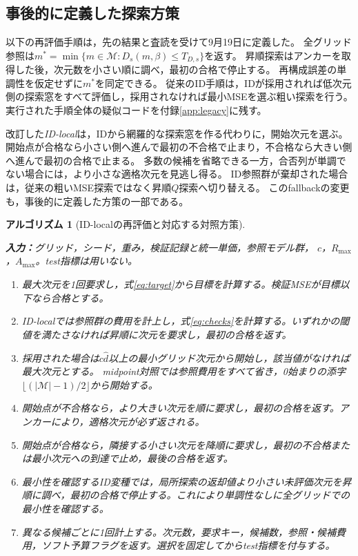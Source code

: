 \documentclass[11pt,a4paper]{ltjsarticle}
\newtheorem{Algorithm}{アルゴリズム}
\begin{document}
\subsection{事後的に定義した探索方策}\label{sec:replay}
以下の再評価手順は，先の結果と査読を受けて9月19日に定義した。
全グリッド参照は$m^*=\min\{m\in\mathcal M:D_s(m,\beta)\le T_{D,s}\}$を返す。
昇順探索はアンカーを取得した後，次元数を小さい順に調べ，最初の合格で停止する。
再構成誤差の単調性を仮定せずに$m^*$を同定できる。
従来のID手順は，IDが採用されれば低次元側の探索窓をすべて評価し，採用されなければ最小MSEを選ぶ粗い探索を行う。
実行された手順全体の疑似コードを付録\ref{app:legacy}に残す。

改訂した\emph{ID-local}は，IDから網羅的な探索窓を作る代わりに，開始次元を選ぶ。
開始点が合格なら小さい側へ進んで最初の不合格で止まり，不合格なら大きい側へ進んで最初の合格で止まる。
多数の候補を省略できる一方，合否列が単調でない場合には，より小さな適格次元を見逃し得る。
ID参照群が棄却された場合は，従来の粗いMSE探索ではなく昇順$Q$探索へ切り替える。
このfallbackの変更も，事後的に定義した方策の一部である。

\medskip\noindent\begin{minipage}{\linewidth}
\begin{Algorithm}[ID-localの再評価と対応する対照方策]
\label{alg:replay}\normalfont\small\leavevmode\par\noindent
\textbf{入力：}グリッド，シード，重み，検証記録と統一単価，参照モデル群，
$c$，$R_{\max}$，$A_{\max}$。test指標は用いない。
\begin{enumerate}
\item 最大次元を1回要求し，式\ref{eq:target}から目標を計算する。検証MSEが目標以下なら合格とする。
\item ID-localでは参照群の費用を計上し，式\ref{eq:checks}を計算する。いずれかの閾値を満たさなければ昇順に次元を要求し，最初の合格を返す。
\item 採用された場合は$c\hat d$以上の最小グリッド次元から開始し，該当値がなければ最大次元とする。
midpoint対照では参照費用をすべて省き，0始まりの添字$\lfloor(|\mathcal M|-1)/2\rfloor$から開始する。
\item 開始点が不合格なら，より大きい次元を順に要求し，最初の合格を返す。アンカーにより，適格次元が必ず返される。
\item 開始点が合格なら，隣接する小さい次元を降順に要求し，最初の不合格または最小次元への到達で止め，最後の合格を返す。
\item 最小性を確認するID変種では，局所探索の返却値より小さい未評価次元を昇順に調べ，最初の合格で停止する。これにより単調性なしに全グリッドでの最小性を確認する。
\item 異なる候補ごとに1回計上する。次元数，要求キー，候補数，参照・候補費用，ソフト予算フラグを返す。選択を固定してからtest指標を付与する。
\end{enumerate}
\end{Algorithm}
\end{minipage}\medskip
\end{document}
